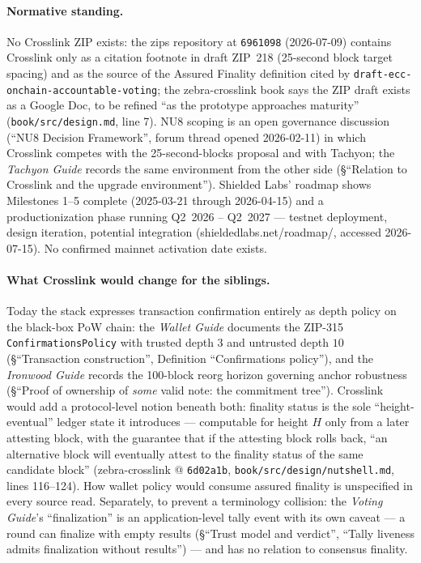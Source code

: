 \documentclass[11pt,a4paper]{article}
\theoremstyle{definition}
\begin{document}
\paragraph{Normative standing.} No Crosslink ZIP exists: the zips
repository at \texttt{6961098} (2026-07-09) contains Crosslink only as a
citation footnote in draft ZIP~218 (25-second block target spacing) and as
the source of the Assured Finality definition cited by
\texttt{draft-ecc-}\allowbreak\texttt{onchain-accountable-voting}; the
zebra-crosslink book
says the ZIP draft exists as a Google Doc, to be refined ``as the
prototype approaches maturity'' (\texttt{book/src/design.md}, line 7).
NU8 scoping is an open governance discussion (``NU8 Decision Framework'',
forum thread opened 2026-02-11) in which Crosslink competes with the
25-second-blocks proposal and with Tachyon; the \emph{Tachyon Guide}
records the same environment from the other side (\S``Relation to
Crosslink and the upgrade environment''). Shielded Labs' roadmap shows
Milestones 1--5 complete (2025-03-21 through 2026-04-15) and a
productionization phase running Q2~2026 -- Q2~2027 --- testnet
deployment, design iteration, potential integration
(shieldedlabs.net/roadmap/, accessed 2026-07-15). No confirmed mainnet
activation date exists.

\paragraph{What Crosslink would change for the siblings.} Today the stack
expresses transaction confirmation entirely as depth policy on the
black-box PoW chain: the \emph{Wallet Guide} documents the ZIP-315
\texttt{ConfirmationsPolicy} with trusted depth $3$ and untrusted depth
$10$ (\S``Transaction construction'', Definition ``Confirmations
policy''), and the \emph{Ironwood Guide} records the 100-block reorg
horizon governing anchor robustness (\S``Proof of ownership of
\emph{some} valid note: the commitment tree''). Crosslink would add a
protocol-level notion beneath both: finality status is the sole
``height-eventual'' ledger state it introduces --- computable for height
$H$ only from a later attesting block, with the guarantee that if the
attesting block rolls back, ``an alternative block will eventually attest
to the finality status of the same candidate block'' (zebra-crosslink @
\texttt{6d02a1b}, \texttt{book/src/design/nutshell.md}, lines 116--124).
How wallet policy would consume assured finality is unspecified in every
source read. Separately, to prevent a terminology collision: the
\emph{Voting Guide}'s ``finalization'' is an application-level tally
event with its own caveat --- a round can finalize with empty results
(\S``Trust model and verdict'', ``Tally liveness admits finalization
without results'') --- and has no relation to consensus finality.
\end{document}
